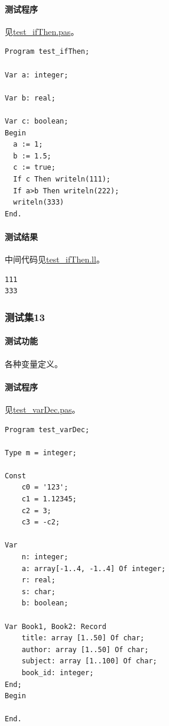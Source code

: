 \documentclass[lang=cn,11pt,a4paper,cite=authornum]{paper}
\begin{document}
\paragraph{测试程序} 见\href{run:../test/test_ifThen.pas}{test\_ifThen.pas}。

\begin{code}
    \begin{verbatim}
Program test_ifThen;

Var a: integer;

Var b: real;

Var c: boolean;
Begin
  a := 1;
  b := 1.5;
  c := true;
  If c Then writeln(111);
  If a>b Then writeln(222);
  writeln(333)
End.
\end{verbatim}
\end{code}

\paragraph{测试结果} 中间代码见\href{run:../test/test_ifThen.ll}{test\_ifThen.ll}。

\begin{code}
    \begin{verbatim}
111
333
\end{verbatim}
\end{code}

\subsubsection{测试集13}

\paragraph{测试功能} 各种变量定义。

\paragraph{测试程序} 见\href{run:../test/test_varDec.pas}{test\_varDec.pas}。

\begin{code}
    \begin{verbatim}
Program test_varDec;

Type m = integer;

Const 
    c0 = '123';
    c1 = 1.12345;
    c2 = 3;
    c3 = -c2;

Var 
    n: integer;
    a: array[-1..4, -1..4] Of integer;
    r: real;
    s: char;
    b: boolean;

Var Book1, Book2: Record
    title: array [1..50] Of char;
    author: array [1..50] Of char;
    subject: array [1..100] Of char;
    book_id: integer;
End;
Begin

End.
\end{verbatim}
\end{code}
\end{document}
